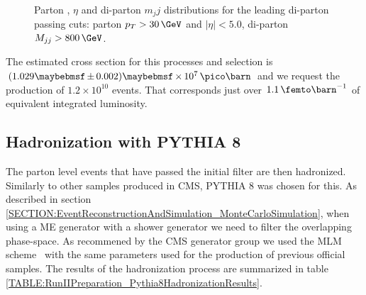 \begin{figure}[!htp]
\\
\caption[Key variables of events passing the parton level filter]{Parton \pt, $\eta$ and di-parton $m_jj$ distributions for the leading di-parton passing cuts: parton $p_{T}>30\,\GeV$ and $|\eta|<5.0$, di-parton $M_{jj}>800\,\GeV$.}
\label{FIGURE:RunIIPreparation_PassPartonFilterDistributions}
\end{figure}

The estimated cross section for this processes and selection is $(1.029 \pm 0.002) \times 10^7 \,\pico\barn$ and we request the production of $1.2 \times 10^{10}$ events. That corresponds just over $1.1\,\femto\barn^{-1}$ of equivalent integrated luminosity. 

\subsection{Hadronization with \textsc{PYTHIA 8}}
\label{SUBSECTION:RunIIPreparation_HadronizationWithPythia8}


The parton level events that have passed the initial filter are then hadronized. Similarly to other samples produced in \gls{CMS}, \textsc{PYTHIA 8} was chosen for this. As described in section \ref{SECTION:EventReconstructionAndSimulation_MonteCarloSimulation}, when using a \gls{ME} generator with a shower generator we need to filter the overlapping phase-space. As recommened by the \gls{CMS} generator group we used the MLM scheme~\cite{ARTICLE:MLMScheme} with the same parameters used for the production of previous official samples. The results of the hadronization process are summarized in table \ref{TABLE:RunIIPreparation_Pythia8HadronizationResults}.

